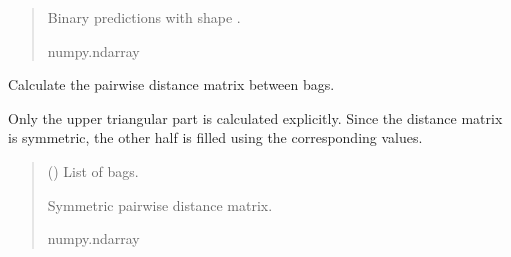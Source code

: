 \documentclass[letterpaper,10pt,english]{sphinxmanual}
\begin{document}
\begin{fulllineitems}
\begin{fulllineitems}
\begin{quote}
\begin{description}
\sphinxAtStartPar
Binary predictions with shape
.

\sphinxAtStartPar
numpy.ndarray

\end{description}\end{quote}

\end{fulllineitems}


\begin{fulllineitems}
\label{\detokenize{classifier/lazy/index:miml.classifier.miml.lazy.multi_instance_multi_label_knn.MultiInstanceMultiLabelKNN.get_distances}}
\pysigstartsignatures
\pysiglinewithargsret
{}
{}
{}
\pysigstopsignatures
\sphinxAtStartPar
Calculate the pairwise distance matrix between bags.

\sphinxAtStartPar
Only the upper triangular part is calculated explicitly.
Since the distance matrix is symmetric, the other half is
filled using the corresponding values.
\begin{quote}\begin{description}
\sphinxAtStartPar
{} () \textendash{} List of bags.

\sphinxAtStartPar
Symmetric pairwise distance matrix.

\sphinxAtStartPar
numpy.ndarray

\end{description}\end{quote}

\end{fulllineitems}



\end{fulllineitems}
\end{document}

